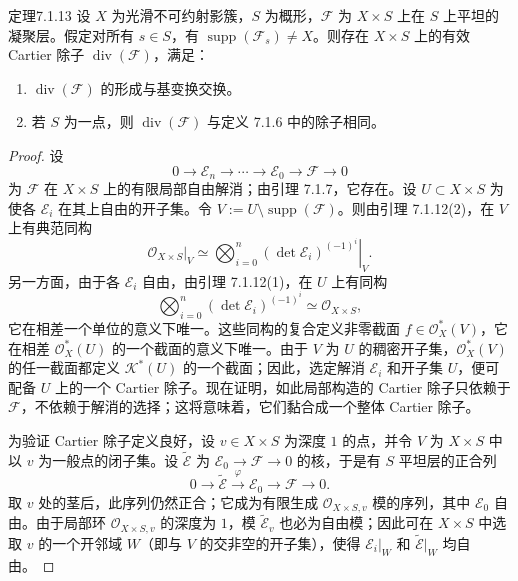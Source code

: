 \begin{origstatement}{定理}{7.1.13}\label{ch07:7.1.13}
设 $X$ 为光滑不可约射影簇，$S$ 为概形，$\mathcal F$ 为 $X\times S$ 上在 $S$ 上平坦的凝聚层。假定对所有 $s\in S$，有 $\operatorname{supp}(\mathcal F_s)\ne X$。则存在 $X\times S$ 上的有效 Cartier 除子 $\operatorname{div}(\mathcal F)$，满足：
\begin{enumerate}[label=(\arabic*)]
\item $\operatorname{div}(\mathcal F)$ 的形成与基变换交换。
\item 若 $S$ 为一点，则 $\operatorname{div}(\mathcal F)$ 与定义 7.1.6 中的除子相同。
\end{enumerate}
\end{origstatement}
\begin{proof}
设
\begin{equation}
0\longrightarrow\mathcal E_n\longrightarrow\cdots\longrightarrow\mathcal E_0\longrightarrow\mathcal F\longrightarrow0\tag{7.1.1}
\end{equation}
为 $\mathcal F$ 在 $X\times S$ 上的有限局部自由解消；由引理 7.1.7，它存在。设 $U\subset X\times S$ 为使各 $\mathcal E_i$ 在其上自由的开子集。令 $V:=U\setminus\operatorname{supp}(\mathcal F)$。则由引理 7.1.12(2)，在 $V$ 上有典范同构
\[
\mathcal O_{X\times S}|_V\simeq
\left.\bigotimes_{i=0}^n(\det\mathcal E_i)^{(-1)^i}\right|_V.
\]
另一方面，由于各 $\mathcal E_i$ 自由，由引理 7.1.12(1)，在 $U$ 上有同构
\[
\bigotimes_{i=0}^n(\det\mathcal E_i)^{(-1)^i}\simeq\mathcal O_{X\times S},
\]
它在相差一个单位的意义下唯一。这些同构的复合定义非零截面 $f\in\mathcal O_X^*(V)$，它在相差 $\mathcal O_X^*(U)$ 的一个截面的意义下唯一。由于 $V$ 为 $U$ 的稠密开子集，$\mathcal O_X^*(V)$ 的任一截面都定义 $\mathcal K^*(U)$ 的一个截面；因此，选定解消 $\mathcal E_i$ 和开子集 $U$，便可配备 $U$ 上的一个 Cartier 除子。现在证明，如此局部构造的 Cartier 除子只依赖于 $\mathcal F$，不依赖于解消的选择；这将意味着，它们黏合成一个整体 Cartier 除子。

为验证 Cartier 除子定义良好，设 $v\in X\times S$ 为深度 $1$ 的点，并令 $V$ 为 $X\times S$ 中以 $v$ 为一般点的闭子集。设 $\widetilde{\mathcal E}$ 为 $\mathcal E_0\to\mathcal F\to0$ 的核，于是有 $S$ 平坦层的正合列
\[
0\longrightarrow\widetilde{\mathcal E}\xrightarrow{\varphi}\mathcal E_0\longrightarrow\mathcal F\longrightarrow0.
\]
取 $v$ 处的茎后，此序列仍然正合；它成为有限生成 $\mathcal O_{X\times S,v}$ 模的序列，其中 $\mathcal E_0$ 自由。由于局部环 $\mathcal O_{X\times S,v}$ 的深度为 $1$，模 $\widetilde{\mathcal E}_v$ 也必为自由模；因此可在 $X\times S$ 中选取 $v$ 的一个开邻域 $W$（即与 $V$ 的交非空的开子集），使得 $\mathcal E_i|_W$ 和 $\widetilde{\mathcal E}|_W$ 均自由。


\end{proof}
